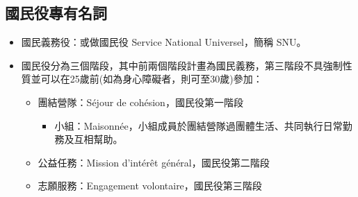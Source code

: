 \documentclass[a4paper,14pt]{extarticle}
\theoremstyle{plain}
\theoremstyle{remark}
\numberwithin{equation}{section}
\begin{document}
\subsection{國民役專有名詞}\label{subsec:snu_term}
\begin{itemize}
	\item 國民義務役：或做國民役 Service National Universel，簡稱 SNU。
  \item 國民役分為三個階段，其中前兩個階段計畫為國民義務，第三階段不具強制性質並可以在25歲前(如為身心障礙者，則可至30歲)參加：
    \begin{itemize}
      \item 
            團結營隊：Séjour de cohésion，國民役第一階段 
    \begin{itemize}
      \item 小組：Maisonnée，小組成員於團結營隊過團體生活、共同執行日常勤務及互相幫助。
    \end{itemize}
  \item 
    公益任務：Mission d'intérêt général，國民役第二階段
  \item 
     志願服務：Engagement volontaire，國民役第三階段 
    \end{itemize}
\end{itemize}


\newpage 



\end{document}
